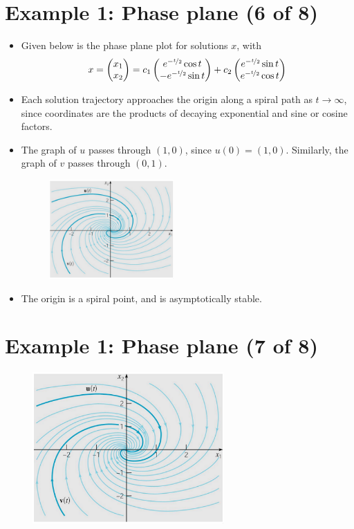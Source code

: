 \documentclass[11pt,a4paper]{article}
\begin{document}
	\section*{Example 1: Phase plane (6 of 8)}
	\begin{itemize}
		\item Given below is the phase plane plot for solutions $x$, with
		$$
		x = 
		\begin{pmatrix}
			x_1\\
			x_2
		\end{pmatrix} = c_1
		\begin{pmatrix}
			e^{-\nicefrac{t}{2}}\cos t\\
			-e^{-\nicefrac{t}{2}}\sin t
		\end{pmatrix} + c_2
		\begin{pmatrix}
			e^{-\nicefrac{t}{2}}\sin t\\
			e^{-\nicefrac{t}{2}}\cos t
		\end{pmatrix}
		$$
		\item Each solution trajectory approaches the origin along a spiral path as $t \to \infty$, since coordinates are the products of decaying exponential and sine or cosine factors.
		\item The graph of $u$ passes through $(1,0)$, since $u(0) = (1,0)$. Similarly, the graph of $v$ passes through $(0,1)$.
		\begin{figure}[H]
			\centering
				\includegraphics[width=0.45\textwidth]{figure/Lec13f2.PNG}
		\end{figure}
		\item The origin is a spiral point, and is asymptotically stable.
	\end{itemize}
	\section*{Example 1: Phase plane (7 of 8)}
	\begin{figure}[H]
		\centering
			\includegraphics[width=0.65\textwidth]{figure/Lec13f2.PNG}
	\end{figure}
\end{document}
